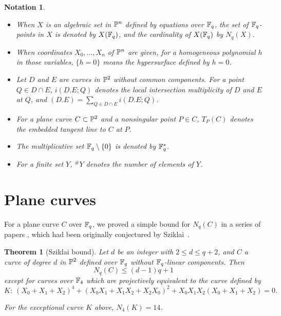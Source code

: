 \documentclass[a4paper,11pt]{article}
\newtheorem{theorem}{Theorem}[section]
\newtheorem{notationinintro}{Notation}
\begin{document}
\begin{notationinintro}
\begin{itemize}
\item When $X$ is an algebraic set in ${\Bbb P}^n$
defined by equations over ${\Bbb F}_q$,
the set of ${\Bbb F}_q$-points in $X$ is denoted by $X({\Bbb F}_q)$,
and the cardinality of $X({\Bbb F}_q)$ by $N_q(X)$.
%
\item When coordinates $X_0, \dots , X_n$ of ${\Bbb P}^n$ are given,
for a homogeneous polynomial $h$ in those variables,
$\{ h=0 \}$ means the hypersurface defined by $h=0$.
%
\item Let $D$ and $E$ are curves in ${\Bbb P}^2$ without common components.
For a point $Q \in D\cap E$,
$i(D.E;Q)$ denotes the local intersection multiplicity of $D$ and $E$ at $Q$,
and $(D.E) = \sum_{Q \in D \cap E} i(D.E;Q)$.
%
\item For a plane curve $C \subset {\Bbb P}^2$
and a nonsingular point $P \in C$,
$T_P(C)$ denotes the embedded tangent line to $C$ at $P$.
%
\item The multiplicative set ${\Bbb F}_q \setminus \{0\}$ is denoted by
${\Bbb F}_q^{\ast}$.
%
\item For a finite set $Y$, ${}^{\#}Y$ denotes the number of elements of $Y$.
\end{itemize}
\end{notationinintro}
\section{Plane curves}
For a plane curve $C$ over ${\Bbb F}_q$,
we proved a simple bound for $N_q(C)$
in a series of papers \cite{hom-kim2009, hom-kim2010a, hom-kim2010b},
which had been originally conjectured by Sziklai~\cite{szi2008}.
\begin{theorem}[Sziklai bound]\label{sziklai_bound}
Let $d$ be an integer with $2 \leq d \leq q+2$,
and $C$ a curve of degree $d$ in ${\Bbb P}^2$
defined over ${\Bbb F}_q$ without ${\Bbb F}_q$-linear components.
Then
\begin{equation}\label{ineq_sziklai_bound}
N_q(C) \leq (d-1)q+1
\end{equation}
except for curves over ${\Bbb F}_4$
which are projectively equivalent to the curve defined by
\[
K: \ 
(X_0 + X_1 + X_2)^4 + (X_0X_1 + X_1X_2 +X_2X_0)^2 +X_0X_1X_2(X_0 + X_1 + X_2)
=0.
\]

For the exceptional curve $K$ above, $N_4(K)=14$.
\end{theorem}
\end{document}
